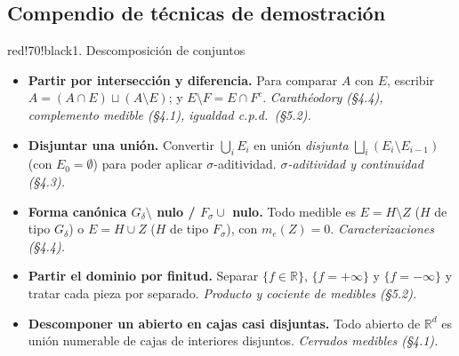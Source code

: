 \documentclass[11pt,twoside]{article}
\newcommand{\R}{\mathbb{R}}
\begin{document}
\subsection{Compendio de t\'ecnicas de demostraci\'on}



\begin{equivbox}{red!70!black}{1. Descomposici\'on de conjuntos}
\begin{itemize}[leftmargin=2em,itemsep=2pt]
\item \textbf{Partir por intersecci\'on y diferencia.} Para comparar $A$ con $E$, escribir $A = (A \cap E) \sqcup (A \setminus E)$; y $E \setminus F = E \cap F^{c}$. \hfill\textit{Carath\'eodory (§4.4), complemento medible (§4.1), igualdad c.p.d.\ (§5.2).}
\item \textbf{Disjuntar una uni\'on.} Convertir $\bigcup_{i} E_{i}$ en uni\'on \emph{disjunta} $\bigsqcup_{i}(E_{i} \setminus E_{i-1})$ (con $E_{0} = \emptyset$) para poder aplicar $\sigma$-aditividad. \hfill\textit{$\sigma$-aditividad y continuidad (§4.3).}
\item \textbf{Forma can\'onica $G_{\delta} \setminus$ nulo / $F_{\sigma} \cup$ nulo.} Todo medible es $E = H \setminus Z$ ($H$ de tipo $G_{\delta}$) o $E = H \cup Z$ ($H$ de tipo $F_{\sigma}$), con $m_{e}(Z) = 0$. \hfill\textit{Caracterizaciones (§4.4).}
\item \textbf{Partir el dominio por finitud.} Separar $\{f \in \R\}$, $\{f = +\infty\}$ y $\{f = -\infty\}$ y tratar cada pieza por separado. \hfill\textit{Producto y cociente de medibles (§5.2).}
\item \textbf{Descomponer un abierto en cajas casi disjuntas.} Todo abierto de $\R^{d}$ es uni\'on numerable de cajas de interiores disjuntos. \hfill\textit{Cerrados medibles (§4.1).}
\end{itemize}
\end{equivbox}
\end{document}
